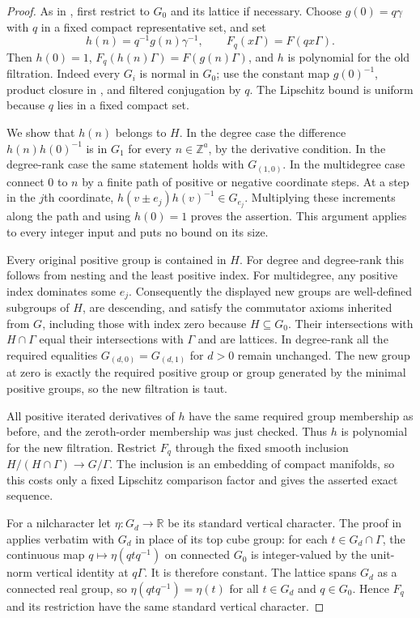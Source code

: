 \documentclass[11pt]{article}
\newcommand{\Z}{\mathbb Z}
\newcommand{\R}{\mathbb R}
\begin{document}
\begin{proof}
As in \cite[Section 3]{LP13}, first restrict to $G_0$ and its lattice if
necessary. Choose $g(0)=q\gamma$ with $q$ in a fixed compact representative
set, and set
\[
 h(n)=q^{-1}g(n)\gamma^{-1},\qquad F_q(x\Gamma)=F(qx\Gamma).
\]
Then $h(0)=1$, $F_q(h(n)\Gamma)=F(g(n)\Gamma)$, and $h$ is polynomial
for the old filtration. Indeed every $G_i$ is normal in $G_0$; use the
constant map $g(0)^{-1}$, product closure in \cite[Corollary B.4]{GTZ},
and filtered conjugation by $q$. The Lipschitz bound is uniform because
$q$ lies in a fixed compact set.

We show that $h(n)$ belongs to $H$. In the degree case the difference
$h(n)h(0)^{-1}$ is in $G_1$ for every $n\in\Z^a$, by the derivative
condition. In the degree-rank case the same statement holds with
$G_{(1,0)}$. In the multidegree case connect $0$ to $n$ by a finite path
of positive or negative coordinate steps. At a step in the $j$th coordinate,
$h(v\pm e_j)h(v)^{-1}\in G_{e_j}$. Multiplying these increments along the
path and using $h(0)=1$ proves the assertion. This argument applies to every
integer input and puts no bound on its size.

Every original positive group is contained in $H$. For degree and
degree-rank this follows from nesting and the least positive index.
For multidegree, any positive index dominates some $e_j$.
Consequently the displayed new groups are well-defined subgroups of $H$,
are descending, and satisfy the commutator axioms inherited from $G$,
including those with index zero because $H\subseteq G_0$.
Their intersections with $H\cap\Gamma$ equal their intersections with
$\Gamma$ and are lattices. In degree-rank all the required equalities
$G_{(d,0)}=G_{(d,1)}$ for $d>0$ remain unchanged. The new group at zero is
exactly the required positive group or group generated by the minimal
positive groups, so the new filtration is taut.

All positive iterated derivatives of $h$ have the same required group
membership as before, and the zeroth-order membership was just checked.
Thus $h$ is polynomial for the new filtration. Restrict $F_q$ through the
fixed smooth inclusion $H/(H\cap\Gamma)\longrightarrow G/\Gamma$.
The inclusion is an embedding of compact manifolds, so this costs only a
fixed Lipschitz comparison factor and gives the asserted exact sequence.

For a nilcharacter let $\eta:G_d\longrightarrow\R$ be its standard
vertical character. The proof in \cite[Section 3]{LP13} applies verbatim
with $G_d$ in place of its top cube group: for each $t\in G_d\cap\Gamma$,
the continuous map $q\mapsto\eta(qtq^{-1})$ on connected $G_0$ is
integer-valued by the unit-norm vertical identity at $q\Gamma$.
It is therefore constant. The lattice spans $G_d$ as a connected real
group, so $\eta(qtq^{-1})=\eta(t)$ for all $t\in G_d$ and $q\in G_0$.
Hence $F_q$ and its restriction have the same standard vertical character.


\end{proof}
\end{document}
